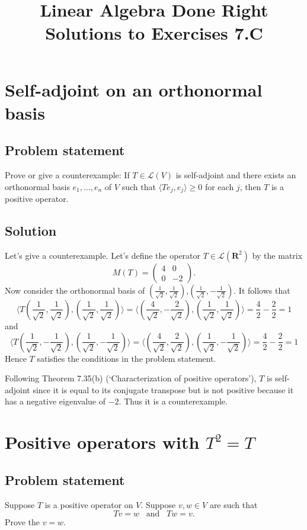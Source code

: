 \documentclass{article}
\title{Linear Algebra Done Right\\Solutions to Exercises 7.C}
\author{}
\date{}
\begin{document}
\maketitle

\section{Self-adjoint on an orthonormal basis}
\subsection*{Problem statement}
Prove or give a counterexample: If $T\in\mathcal{L}(V)$ is self-adjoint and there exists an orthonormal basis $e_1,\ldots,e_n$ of $V$ such that $\langle Te_j,e_j\rangle \geq 0$ for each $j$, then $T$ is a positive operator.

\subsection*{Solution}
Let's give a counterexample. Let's define the operator $T\in\mathcal{L}(\mathbf{R}^2)$ by the matrix
\[M(T) = \begin{pmatrix}4 & 0 \\0 & -2\end{pmatrix}.\]
Now consider the orthonormal basis of $(\frac{1}{\sqrt{2}},\frac{1}{\sqrt{2}})$,$(\frac{1}{\sqrt{2}},-\frac{1}{\sqrt{2}})$. It follows that 
\[\langle T(\frac{1}{\sqrt{2}},\frac{1}{\sqrt{2}}),(\frac{1}{\sqrt{2}},\frac{1}{\sqrt{2}})\rangle=\langle (\frac{4}{\sqrt{2}},-\frac{2}{\sqrt{2}}),(\frac{1}{\sqrt{2}},\frac{1}{\sqrt{2}}) \rangle = \frac{4}{2} -\frac{2}{2}=1 \]
and
\[\langle T(\frac{1}{\sqrt{2}},-\frac{1}{\sqrt{2}}),(\frac{1}{\sqrt{2}},-\frac{1}{\sqrt{2}})\rangle=\langle (\frac{4}{\sqrt{2}},\frac{2}{\sqrt{2}}),(\frac{1}{\sqrt{2}},-\frac{1}{\sqrt{2}}) \rangle = \frac{4}{2} -\frac{2}{2}=1 \]
Hence $T$ satisfies the conditions in the problem statement.

Following Theorem 7.35(b) (`Characterization of positive operators'), $T$ is self-adjoint since it is equal to its conjugate transpose but is not positive because it has a negative eigenvalue of $-2$. Thus it is a counterexample.

\clearpage

\section{Positive operators with $T^2=T$}
\subsection*{Problem statement}
Suppose $T$ is a positive operator on $V$. Suppose $v,w\in V$ are such that 
\[Tv=w\;\;\;\text{and}\;\;\;Tw=v.\]
Prove the $v=w$.
\end{document}

